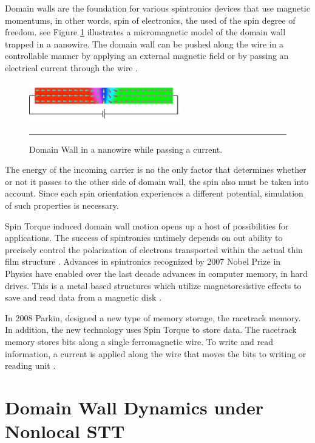 Domain walls are the foundation for various spintronics devices that use magnetic momentums, in other words, spin of electronics, the used of the spin degree of freedom. see Figure \ref{fig:DWspin} illustrates a micromagnetic model of the domain wall trapped in a nanowire. The domain wall can be pushed along the wire in a controllable manner by applying an external magnetic field or by passing an electrical current through the wire \cite{dwwire}.

\begin{figure}[htbp]
	\centering
		\includegraphics[width=0.6\textwidth]{Figures/DWspin.png}
		\rule{35em}{0.52pt}
	\caption[Domain wall nanowire]{Domain Wall in a nanowire while passing a current.}
	\label{fig:DWspin}
\end{figure}

The energy of the incoming  carrier is no the only factor that determines whether or not it passes to the other side of domain wall, the spin also must be taken into account. Since each spin orientation experiences a different potential, simulation of such properties is necessary.

Spin Torque induced domain wall motion opens up a host of possibilities for applications. The success of spintronics untimely depends on out ability to precisely  control the polarization of electrons transported within the actual thin film structure \cite{ferro}. Advances in spintronics recognized by 2007 Nobel Prize in Physics have enabled over the last decade advances in computer memory, in hard drives. This is a metal based structures which utilize magnetoresistive effects to save and read data from a magnetic disk \cite{handbookspin}.

 In 2008 Parkin, designed a new type of memory storage, the racetrack memory. In addition, the new technology uses Spin Torque to store data. The racetrack memory stores bits along a single ferromagnetic wire. To write and read information, a current is applied along the wire that moves the bits to writing or reading unit \cite{racetrack}.
 
\section{Domain Wall Dynamics under Nonlocal STT}

